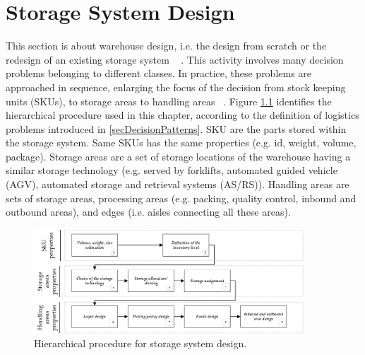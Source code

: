 \chapter{Storage System Design} \label{chapWhDesign}

This section is about warehouse design, i.e. the design from scratch or the redesign of an existing storage system ~\cite{Ashayeri1985, VanGils2017b} . This activity involves many decision problems belonging to different classes. In practice, these problems are approached in sequence, enlarging the focus of the decision from stock keeping units (SKUs), to storage areas to handling areas ~\cite{Accorsi2012, Baker2009, Dotoli2015, Park1989, Tufano2019,Yoon1996}. Figure \ref{fig_warehouse_design} identifies the hierarchical procedure used in this chapter, according to the definition of logistics problems introduced in \ref{secDecisionPatterns}. SKU are the parts stored within the storage system. Same SKUs has the same properties (e.g. id, weight, volume, package). Storage areas are a set of storage locations of the warehouse having a similar storage technology (e.g. served by forklifts, automated guided vehicle (AGV), automated storage and retrieval systems (AS/RS)). Handling areas are sets of storage areas, processing areas (e.g. packing, quality control, inbound and outbound areas), and edges (i.e. aisles connecting all these areas).

\begin{figure}[hbt!]
\centering
\includegraphics[width=0.9\textwidth]{SectionWarehouses/design_figures/fig_warehouse_design.png}
\captionsetup{type=figure}
\caption{Hierarchical procedure for storage system design.}
\label{fig_warehouse_design}
\end{figure}

